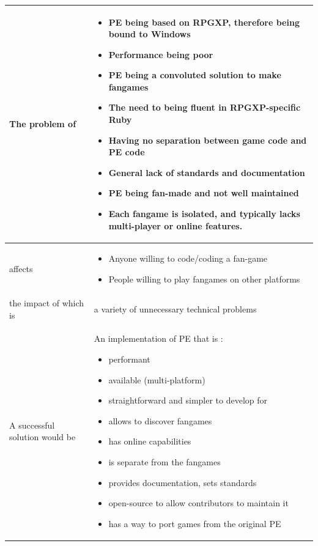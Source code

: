 \documentclass[11pt]{article}
\begin{document}
\begin{tabular}{|a|L{.66\linewidth}|}
	\hline
	The problem of & \begin{itemize}
		\item PE being based on RPGXP, therefore being bound to Windows
		
		\item Performance being poor
		
		\item PE being a convoluted solution to make fangames
		
		\item The need to being fluent in RPGXP-specific Ruby
		
		\item Having no separation between game code and PE code
		
		\item General lack of standards and documentation
		
		\item PE being fan-made and not well maintained
		
		\item Each fangame is isolated, and typically lacks multi-player or online features.
	\end{itemize} \\
	\hline
	affects & \begin{itemize}
		\item Anyone willing to code/coding a fan-game 
		\item People willing to play fangames on other platforms
	\end{itemize} \\
	\hline
	the impact of which is & a variety of unnecessary technical problems \\
	\hline
	A successful solution would be & An implementation of PE that is : \begin{itemize}
		\item performant
		\item available (multi-platform)
		\item straightforward and simpler to develop for
		\item allows to discover fangames
		\item has online capabilities
		\item is separate from the fangames
		\item provides documentation, sets standards
		\item open-source to allow contributors to maintain it
		\item has a way to port games from the original PE
	\end{itemize} \\
	\hline
\end{tabular}
\end{document}
